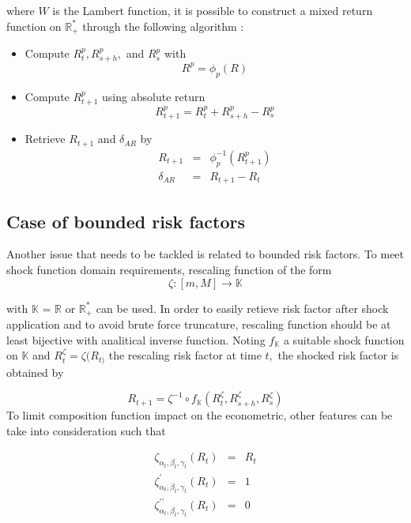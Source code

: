 \documentclass[3pt]{article}
\begin{document}
where $W$ is the Lambert function, it is possible to construct a mixed
return function on $\mathbb{R}_{+}^{\ast }$ through the following algorithm :

\bigskip

\begin{itemize}
\item Compute $R_{t}^{p},R_{s+h}^{p},$ and $R_{s}^{p}$ with 
\begin{equation*}
R^{p}=\phi _{p}(R)
\end{equation*}

\item Compute $R_{t+1}^{p}$ using absolute return 
\begin{equation*}
R_{t+1}^{p}=R_{t}^{p}+R_{s+h}^{p}-R_{s}^{p}
\end{equation*}

\item Retrieve $R_{t+1}$ and $\delta _{AR}$ by 
\begin{eqnarray*}
R_{t+1} &=&\phi _{p}^{-1}(R_{t+1}^{p}) \\
\delta _{AR} &=&R_{t+1}-R_{t}
\end{eqnarray*}
\end{itemize}

\subsection{Case of bounded risk factors}

Another issue that needs to be tackled is related to bounded risk factors.
To meet shock function domain requirements, rescaling function of the form 
\begin{equation*}
\zeta :[m,M]\rightarrow \mathbb{K}
\end{equation*}

with $\mathbb{K}$ = $\mathbb{R}$ or $\mathbb{R}_{+}^{\ast }$ can be used. In
order to easily retieve risk factor after shock application and to avoid
brute force truncature, rescaling function should be at least bijective with
analitical inverse function. Noting $f_{\mathbb{K}}$ a suitable shock
function on $\mathbb{K}$ and $R_{t}^{\zeta }=\zeta (R_{t)}$ the rescaling
risk factor at time $t,$ the shocked risk factor is obtained by

\begin{equation*}
R_{t+1}=\zeta ^{-1}\circ f_{\mathbb{K}}(R_{t}^{\zeta },R_{s+h}^{\zeta
},R_{s}^{\zeta })
\end{equation*}%
To limit composition function impact on the econometric, other features can
be take into consideration such that

\begin{eqnarray*}
\zeta _{\alpha _{t},\beta _{t},\gamma _{t}}(R_{t}) &=&R_{t} \\
\zeta _{\alpha _{t},\beta _{t},\gamma _{t}}^{\prime }(R_{t}) &=&1 \\
\zeta _{\alpha _{t},\beta _{t},\gamma _{t}}^{\prime \prime }(R_{t}) &=&0
\end{eqnarray*}
\end{document}
